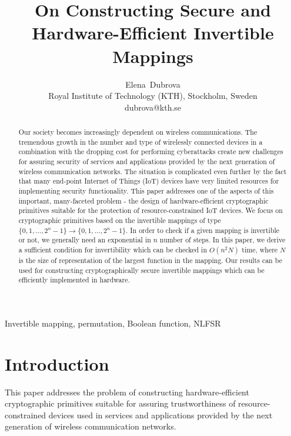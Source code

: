 \documentclass[9pt,conference]{IEEEtran} \usepackage{times}
\begin{document}
\title{On Constructing Secure and Hardware-Efficient Invertible Mappings}
\author{
Elena~Dubrova  \\
Royal Institute of Technology (KTH), Stockholm, Sweden \\ 
dubrova@kth.se
}

\maketitle
 
\begin{abstract}
Our society becomes increasingly dependent on wireless communications. The tremendous growth in the number and type of wirelessly connected devices in a combination with the dropping cost for performing cyberattacks create new challenges for assuring security of services and applications provided by the next generation of wireless communication networks. The situation is complicated even further by the fact that many end-point Internet of Things (IoT) devices have very limited resources for implementing security functionality. This paper addresses one of the aspects of this important, many-faceted problem - the design of hardware-efficient cryptographic primitives suitable for the protection of resource-constrained IoT devices. We focus on cryptographic primitives based on the invertible mappings of type $\{0,1,\ldots,2^n-1\} \rightarrow \{0,1,\ldots,2^n-1\}$.
In order to check if a given mapping is invertible or not, we generally need an exponential in $n$ number of steps.
In this paper, we derive a sufficient condition for invertibility which can be checked in $O(n^2 N)$ time, where $N$ is the size of representation of the largest function in the mapping. Our results can be used for constructing cryptographically secure invertible mappings which can be efficiently implemented in hardware.
\end{abstract}

\begin{keywords} 
Invertible mapping, permutation, Boolean function, NLFSR
\end{keywords}


\section{Introduction}

This paper addresses the problem of constructing hardware-efficient cryptographic primitives 
suitable for assuring trustworthiness of resource-constrained devices used in services and applications provided by the next generation of wireless communication networks.
 
\end{document}
